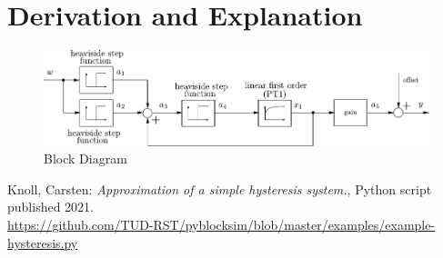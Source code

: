 \documentclass[10pt,a4paper]{article}
\begin{document}
	\section{Derivation and Explanation} %
	\begin{figure}[H]
		\centering
		\includegraphics[width=120mm]{hysteresis_block.pdf}
		\caption{Block Diagram}
	\end{figure}
	
	
	
	\begin{thebibliography}{10}		
		Knoll, Carsten: 
		\textit{Approximation of a simple hysteresis system.}, Python script published 2021. \\
		\url{https://github.com/TUD-RST/pyblocksim/blob/master/examples/example-hysteresis.py}
	\end{thebibliography}
\end{document}
